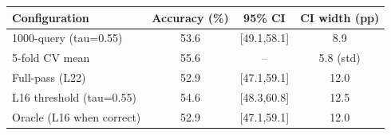 \begin{tabular}{lccc}\toprule
Configuration & Accuracy (\%) & 95\% CI & CI width (pp)\\
\midrule
1000-query (tau=0.55) & 53.6 & [49.1,58.1] & 8.9\\
5-fold CV mean & 55.6 & -- & 5.8 (std)\\
Full-pass (L22) & 52.9 & [47.1,59.1] & 12.0\\
L16 threshold (tau=0.55) & 54.6 & [48.3,60.8] & 12.5\\
Oracle (L16 when correct) & 52.9 & [47.1,59.1] & 12.0\\
\bottomrule\end{tabular}
